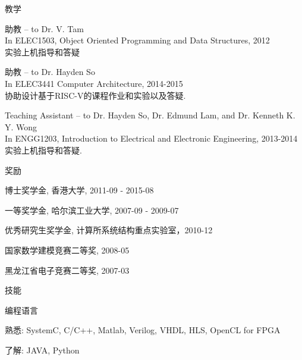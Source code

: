 \documentclass{resume} %
\begin{document}
\begin{rSection}{教学}
    \vspace{-1em}
\item 助教 – to Dr. V. Tam \\In ELEC1503, Object Oriented Programming 
and Data Structures, 2012 \\实验上机指导和答疑

\item 助教 – to Dr. Hayden So \\In ELEC3441 Computer Architecture, 2014-2015
\\协助设计基于RISC-V的课程作业和实验以及答疑.

\item Teaching Assistant – to Dr. Hayden So, Dr. Edmund Lam, and Dr. Kenneth K. Y. Wong 
\\In ENGG1203, Introduction to Electrical and Electronic Engineering, 2013-2014
\\实验上机指导和答疑. 

\end{rSection}

\begin{rSection}{奖励}
    \vspace{-1em}
\item 博士奖学金, 香港大学, 2011-09 - 2015-08 
    \vspace{-0.5em}
\item 一等奖学金, 哈尔滨工业大学, 2007-09 - 2009-07
    \vspace{-0.5em}
\item 优秀研究生奖学金, 计算所系统结构重点实验室，2010-12
    \vspace{-0.5em}
\item 国家数学建模竞赛二等奖, 2008-05
    \vspace{-0.5em}
\item 黑龙江省电子竞赛二等奖, 2007-03
    \vspace{-0.5em}
\end{rSection}

\begin{rSection}{技能}
    \begin{rSubsection}{编程语言}{}{}{}
    \item 熟悉: SystemC, C/C++, Matlab, Verilog, VHDL, HLS, OpenCL for FPGA
    \item 了解: JAVA, Python
    \end{rSubsection}
\end{rSection}
\end{document}
